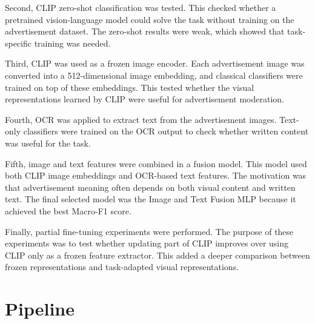 \documentclass[12pt]{article}
\begin{document}
Second, CLIP zero-shot classification was tested. This checked whether a pretrained vision-language model could solve the task without training on the advertisement dataset. The zero-shot results were weak, which showed that task-specific training was needed.

Third, CLIP was used as a frozen image encoder. Each advertisement image was converted into a 512-dimensional image embedding, and classical classifiers were trained on top of these embeddings. This tested whether the visual representations learned by CLIP were useful for advertisement moderation.

Fourth, OCR was applied to extract text from the advertisement images. Text-only classifiers were trained on the OCR output to check whether written content was useful for the task.

Fifth, image and text features were combined in a fusion model. This model used both CLIP image embeddings and OCR-based text features. The motivation was that advertisement meaning often depends on both visual content and written text. The final selected model was the Image and Text Fusion MLP because it achieved the best Macro-F1 score.

Finally, partial fine-tuning experiments were performed. The purpose of these experiments was to test whether updating part of CLIP improves over using CLIP only as a frozen feature extractor. This added a deeper comparison between frozen representations and task-adapted visual representations.

\section{Pipeline}
\end{document}
